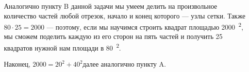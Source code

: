 \begin{itemize}
\begin{multicols}{2}
\end{multicols}

\itC Аналогично пункту B данной задачи мы умеем делить на произвольное количество частей любой отрезок, начало и конец которого — узлы сетки. Также $80 \cdot 25 = 2000$ — поэтому, если мы научимся строить квадрат площадью \SI{2000}{^2}, мы сможем поделить каждую из его сторон на пять частей и получить 25 квадратов нужной нам площади в \SI{80}{^2}.

Наконец, $2000 = 20^2 + 40^2$\scolon далее аналогично пункту A.
\end{itemize}
